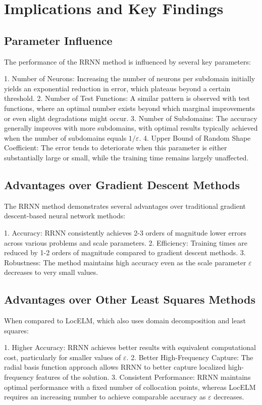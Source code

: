 \documentclass[11pt]{article}
\begin{document}
\section{Implications and Key Findings}

\subsection{Parameter Influence}

The performance of the RRNN method is influenced by several key parameters:

1. Number of Neurons: Increasing the number of neurons per subdomain initially yields an exponential reduction in error, which plateaus beyond a certain threshold.
2. Number of Test Functions: A similar pattern is observed with test functions, where an optimal number exists beyond which marginal improvements or even slight degradations might occur.
3. Number of Subdomains: The accuracy generally improves with more subdomains, with optimal results typically achieved when the number of subdomains equals $1/\varepsilon$.
4. Upper Bound of Random Shape Coefficient: The error tends to deteriorate when this parameter is either substantially large or small, while the training time remains largely unaffected.

\subsection{Advantages over Gradient Descent Methods}

The RRNN method demonstrates several advantages over traditional gradient descent-based neural network methods:

1. Accuracy: RRNN consistently achieves 2-3 orders of magnitude lower errors across various problems and scale parameters.
2. Efficiency: Training times are reduced by 1-2 orders of magnitude compared to gradient descent methods.
3. Robustness: The method maintains high accuracy even as the scale parameter $\varepsilon$ decreases to very small values.

\subsection{Advantages over Other Least Squares Methods}

When compared to LocELM, which also uses domain decomposition and least squares:

1. Higher Accuracy: RRNN achieves better results with equivalent computational cost, particularly for smaller values of $\varepsilon$.
2. Better High-Frequency Capture: The radial basis function approach allows RRNN to better capture localized high-frequency features of the solution.
3. Consistent Performance: RRNN maintains optimal performance with a fixed number of collocation points, whereas LocELM requires an increasing number to achieve comparable accuracy as $\varepsilon$ decreases.
\end{document}
